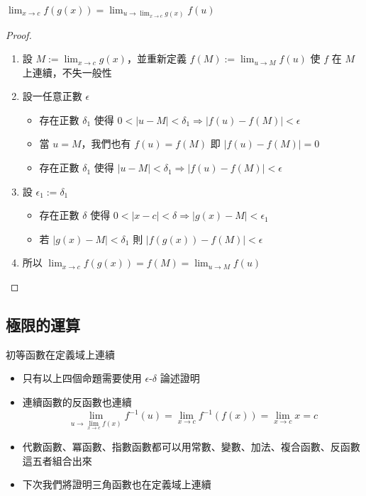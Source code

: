 \documentclass{beamer}
\begin{document}
\begin{CJK}{UTF8}{bsmi}
\begin{frame}{$\displaystyle \lim_{x \to c} f(g(x)) = \lim_{u \to \lim_{x \to c} g(x)} f(u)$}
  \begin{proof}
    \begin{enumerate}
      \item 設 $\displaystyle M := \lim_{x \to c} g(x)$，並重新定義 $\displaystyle f(M) := \lim_{u \to M} f(u)$ 使 $f$ 在 $M$
	    上連續，不失一般性
      \item 設一任意正數 $\epsilon$
	\begin{itemize}
	  \item 存在正數 $\delta_1$ 使得 $0 < |u-M| < \delta_1 \Rightarrow |f(u) - f(M)| < \epsilon$
	  \item 當 $u = M$，我們也有 $f(u) = f(M)$ 即 $|f(u) - f(M)| = 0$
	  \item 存在正數 $\delta_1$ 使得 $|u-M| < \delta_1 \Rightarrow |f(u) - f(M)| < \epsilon$
	\end{itemize}
      \item 設 $\epsilon_1 := \delta_1$
	\begin{itemize}
	  \item 存在正數 $\delta$ 使得 $0 < |x-c| < \delta \Rightarrow |g(x) - M| < \epsilon_1$
	  \item 若 $|g(x) - M| < \delta_1$ 則 $|f(g(x)) - f(M)| < \epsilon$
	\end{itemize}
      \item 所以 $\displaystyle \lim_{x \to c} f(g(x)) = f(M) = \lim_{u \to M} f(u)$
    \end{enumerate}
  \end{proof}
\end{frame}

\subsection{極限的運算}
\begin{frame}{初等函數在定義域上連續}
  \begin{itemize}
    \item 只有以上四個命題需要使用 $\epsilon$-$\delta$ 論述證明
    \item 連續函數的反函數也連續
      \[\lim_{u \to \lim_{x \to c} f(x)} f^{-1}(u) = \lim_{x \to c} f^{-1}(f(x)) = \lim_{x \to c} x = c\]
    \item 代數函數、冪函數、指數函數都可以用常數、變數、加法、複合函數、反函數這五者組合出來
    \item 下次我們將證明三角函數也在定義域上連續
  \end{itemize}
\end{frame}


\end{CJK}
\end{document}
